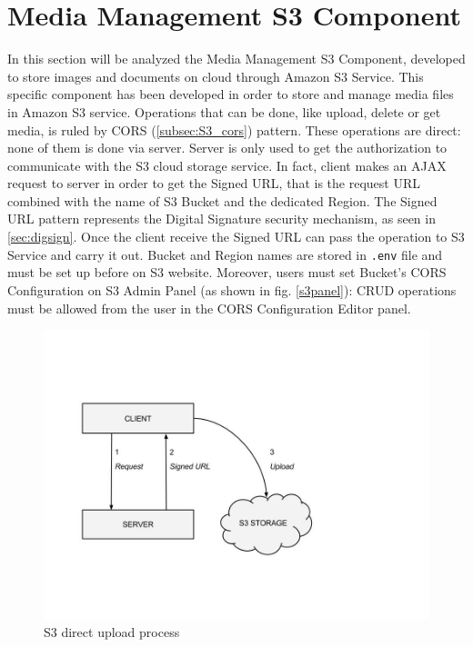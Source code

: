 \section{Media Management S3 Component}
\label{sec:S3_component}

In this section will be analyzed the Media Management S3 Component, developed to store images and documents on cloud through Amazon S3 Service.
This specific component has been developed in order to store and manage media files in Amazon S3 service.
Operations that can be done, like upload, delete or get media, is ruled by CORS (\ref{subsec:S3_cors}) pattern.
These operations are direct: none of them is done via server. Server is only used to get the authorization to communicate with the S3 cloud storage service.
In fact, client makes an AJAX request to server in order to get the Signed URL, that is the request URL combined with the name of S3 Bucket and the dedicated Region.
The Signed URL pattern represents the Digital Signature security mechanism, as seen in \ref{sec:digsign}.
Once the client receive the Signed URL can pass the operation to S3 Service and carry it out.
Bucket and Region names are stored in \texttt{.env} file and must be set up before on S3 website.
Moreover, users must set Bucket's CORS Configuration on S3 Admin Panel (as shown in fig. \ref{s3panel}): CRUD operations must be allowed from the user in the CORS Configuration Editor panel.

\begin {figure}[h]
\graphicspath{{images/chapter_s3/}}
\includegraphics[width=\textwidth]{s3_upload}
\caption{S3 direct upload process}
\end {figure}


